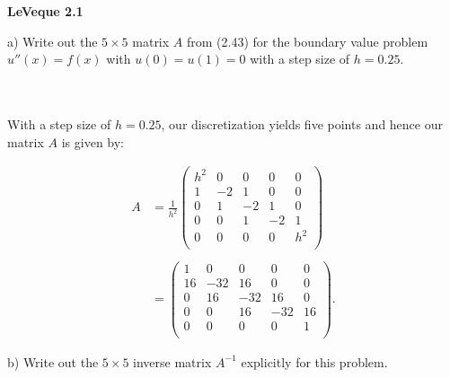 \textbf{LeVeque 2.1} 

a) Write out the $5 \times 5$ matrix $A$ from (2.43) for the boundary value problem \linebreak $u''(x) = f(x)$ with 
   $u(0) = u(1) = 0$ with a step size of $h = 0.25$.

\begin{solution}\ \\\\
    With a step size of $h = 0.25$, our discretization yields five points and hence our matrix $A$ is given by:

    \begin{align*}
        A &= \frac{1}{h^2}
        \begin{pmatrix}
         h^2 &  0 &  0 &  0 &   0 \\
           1 & -2 &  1 &  0 &   0 \\
           0 &  1 & -2 &  1 &   0 \\
           0 &  0 &  1 & -2 &   1 \\
           0 &  0 &  0 &  0 & h^2 \\
        \end{pmatrix} \\\\
        &= 
        \begin{pmatrix}
             1 &   0 &   0  &   0 &  0 \\
            16 & -32 &  16  &   0 &  0 \\
             0 &  16 & -32  &  16 &  0 \\
             0 &   0 &  16  & -32 & 16 \\
             0 &   0 &   0  &   0 &  1 \\
        \end{pmatrix}.
    \end{align*}
\end{solution}

\pagebreak
b) Write out the $5 \times 5$ inverse matrix $A^{-1}$ explicitly for this problem.

